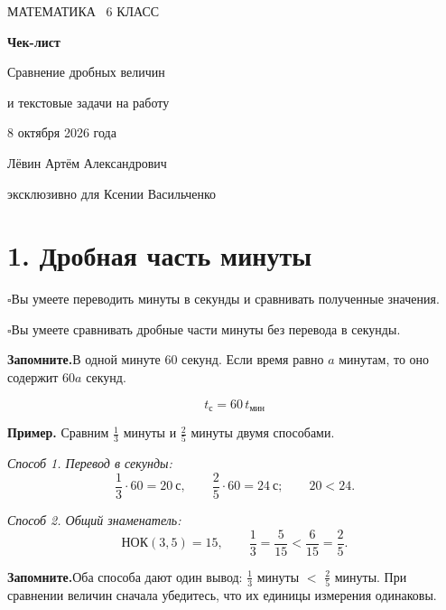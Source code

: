 \documentclass[a4paper,12pt]{article}
\newcommand{\sectionline}[1]{\section*{\color{darkaccent}#1}}
\newcommand{\learn}[1]{\par\noindent$\square$\enspace #1\par}
\newcommand{\keyidea}[1]{\par\noindent\textcolor{darkaccent}{\textbf{Запомните.}}\enspace #1\par}
\begin{document}
\begin{titlepage}
\thispagestyle{empty}
\centering
\vspace*{32mm}
{\color{accent}\large МАТЕМАТИКА \textbullet\ 6 КЛАСС\par}
\vspace{19mm}
{\color{darkaccent}\Huge\bfseries Чек-лист\par}
\vspace{8mm}
{\LARGE Сравнение дробных величин\par}
\vspace{3mm}
{\Large и текстовые задачи на работу\par}
\vspace{21mm}
{\large 8 октября 2026 года\par}
\vfill
{\large Лёвин Артём Александрович\par}
\vspace{2mm}
{\normalsize эксклюзивно для Ксении Васильченко\par}
\vspace{33mm}
\end{titlepage}

\sectionline{1. Дробная часть минуты}
\learn{Вы умеете переводить минуты в секунды и сравнивать полученные значения.}
\learn{Вы умеете сравнивать дробные части минуты без перевода в секунды.}

\keyidea{В одной минуте 60 секунд. Если время равно $a$ минутам, то оно содержит $60a$ секунд.}
\[
\boxed{t_{\text{с}}=60\,t_{\text{мин}}}
\]

\textbf{Пример.} Сравним $\frac13$ минуты и $\frac25$ минуты двумя способами.

\textit{Способ 1. Перевод в секунды:}
\[
\frac13\cdot60=20\ \text{с},\qquad
\frac25\cdot60=24\ \text{с};\qquad 20<24.
\]

\textit{Способ 2. Общий знаменатель:}
\[
\text{НОК}(3,5)=15,\qquad
\frac13=\frac5{15}<\frac6{15}=\frac25.
\]

\keyidea{Оба способа дают один вывод: $\frac13$ минуты $<$ $\frac25$ минуты. При сравнении величин сначала убедитесь, что их единицы измерения одинаковы.}
\end{document}
